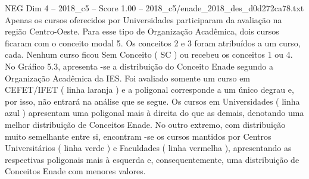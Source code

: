 \begin{textsample}{NEG Dim 4 – 2018\_c5 – Score 1.00 – 2018\_c5/enade\_2018\_des\_d0d272ca78.txt}
Apenas os cursos oferecidos por Universidades participaram da avaliação na região Centro-Oeste.
Para esse tipo de Organização Acadêmica, dois cursos ficaram com o conceito modal 5.
Os conceitos 2 e 3 foram atribuídos a um curso, cada.
Nenhum curso ficou Sem Conceito ( SC ) ou recebeu os conceitos 1 ou 4.
No Gráfico 5.3, apresenta -se a distribuição do Conceito Enade segundo a Organização Acadêmica da IES.
Foi avaliado somente um curso em CEFET/IFET ( linha laranja ) e a poligonal corresponde a um único degrau e, por isso, não entrará na análise que se segue.
Os cursos em Universidades ( linha azul ) apresentam uma poligonal mais à direita do que as demais, denotando uma melhor distribuição de Conceitos Enade.
No outro extremo, com distribuição muito semelhante entre si, encontram -se os cursos mantidos por Centros Universitários ( linha verde ) e Faculdades ( linha vermelha ), apresentando as respectivas poligonais mais à esquerda e, consequentemente, uma distribuição de Conceitos Enade com menores valores.

\end{textsample}
